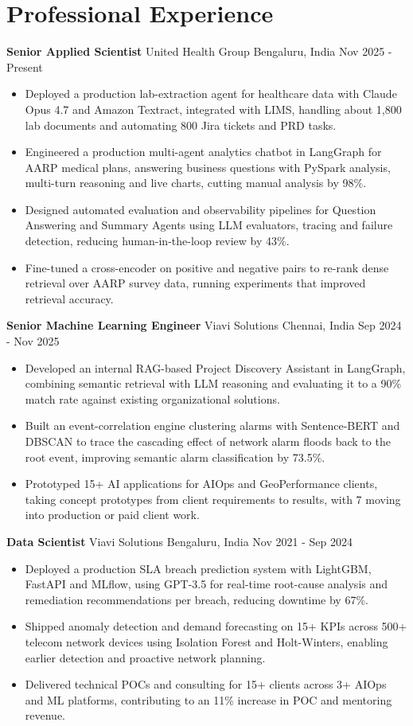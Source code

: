 \documentclass[10pt,a4paper]{article}
\newcommand{\role}[4]{\textbf{#1} \textbar{} #2 \hfill #3 \textbar{} #4\par}
\begin{document}
\section{Professional Experience}
\role{Senior Applied Scientist}{United Health Group}{Bengaluru, India}{Nov 2025 - Present}
\begin{itemize}
  \item Deployed a production lab-extraction agent for healthcare data with Claude Opus 4.7 and Amazon Textract, integrated with LIMS, handling about 1,800 lab documents and automating 800 Jira tickets and PRD tasks.
  \item Engineered a production multi-agent analytics chatbot in LangGraph for AARP medical plans, answering business questions with PySpark analysis, multi-turn reasoning and live charts, cutting manual analysis by 98\%.
  \item Designed automated evaluation and observability pipelines for Question Answering and Summary Agents using LLM evaluators, tracing and failure detection, reducing human-in-the-loop review by 43\%.
  \item Fine-tuned a cross-encoder on positive and negative pairs to re-rank dense retrieval over AARP survey data, running experiments that improved retrieval accuracy.
\end{itemize}
\vspace{3pt}
\role{Senior Machine Learning Engineer}{Viavi Solutions}{Chennai, India}{Sep 2024 - Nov 2025}
\begin{itemize}
  \item Developed an internal RAG-based Project Discovery Assistant in LangGraph, combining semantic retrieval with LLM reasoning and evaluating it to a 90\% match rate against existing organizational solutions.
  \item Built an event-correlation engine clustering alarms with Sentence-BERT and DBSCAN to trace the cascading effect of network alarm floods back to the root event, improving semantic alarm classification by 73.5\%.
  \item Prototyped 15+ AI applications for AIOps and GeoPerformance clients, taking concept prototypes from client requirements to results, with 7 moving into production or paid client work.
\end{itemize}
\vspace{3pt}
\role{Data Scientist}{Viavi Solutions}{Bengaluru, India}{Nov 2021 - Sep 2024}
\begin{itemize}
  \item Deployed a production SLA breach prediction system with LightGBM, FastAPI and MLflow, using GPT-3.5 for real-time root-cause analysis and remediation recommendations per breach, reducing downtime by 67\%.
  \item Shipped anomaly detection and demand forecasting on 15+ KPIs across 500+ telecom network devices using Isolation Forest and Holt-Winters, enabling earlier detection and proactive network planning.
  \item Delivered technical POCs and consulting for 15+ clients across 3+ AIOps and ML platforms, contributing to an 11\% increase in POC and mentoring revenue.
\end{itemize}
\end{document}
